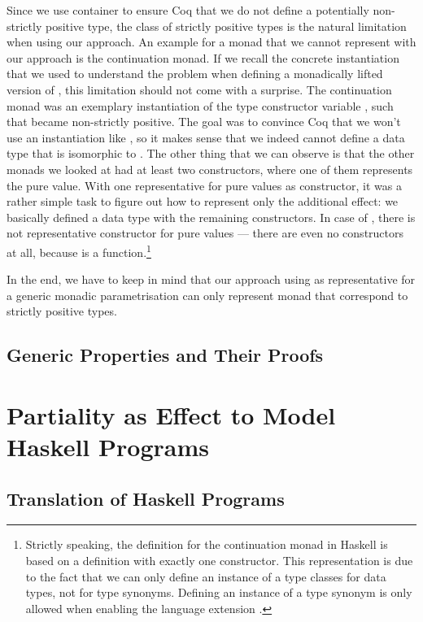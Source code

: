 Since we use container to ensure Coq that we do not define a
potentially non-strictly positive type, the class of strictly positive
types is the natural limitation when using our approach.
An example for a monad that we cannot represent with our approach is
the continuation monad.
If we recall the concrete instantiation that we used to understand the
problem when defining a monadically lifted version of ,
this limitation should not come with a surprise.
The continuation monad  was an exemplary instantiation of
the type constructor variable , such that  became
non-strictly positive.
The goal was to convince Coq that we won't use an instantiation like
, so it makes sense that we indeed cannot define a data
type that is isomorphic to . 
The other thing that we can observe is that the other monads we looked
at had at least two constructors, where one of them represents the
pure value.
With one representative for pure values as constructor, it was a
rather simple task to figure out how to represent only the additional
effect: we basically defined a data type with the remaining
constructors.
In case of , there is not representative constructor for
pure values --- there are even no constructors at all, because
 is a function.\footnote{Strictly speaking, the definition
  for the continuation monad in Haskell is based on a 
  definition with exactly one constructor. This representation is due
  to the fact that we can only define an instance of a type classes
  for data types, not for type synonyms. Defining an instance of a type
synonym is only allowed when enabling the language extension
.}

In the end, we have to keep in mind that our approach using
 as representative for a generic monadic parametrisation
can only represent monad that correspond to strictly positive types.


\subsection{Generic Properties and Their Proofs}

\section{Partiality as Effect to Model Haskell Programs}
\subsection{Translation of Haskell Programs}
